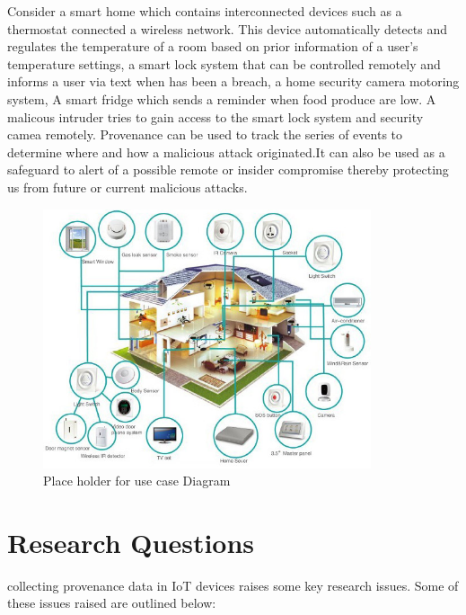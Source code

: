 Consider a smart home which contains interconnected devices such as a thermostat connected a wireless network. This device automatically detects and regulates the temperature of a room based on prior information of a user's temperature settings, a smart lock system that can be controlled remotely and informs a user via text when has been a breach, a home security camera motoring system, A smart fridge which sends a reminder when food produce are low. A malicous intruder tries to gain access to the smart lock system and security camea remotely. Provenance can be used to track the series  of events to determine where and how a malicious attack originated.It can also be used as a safeguard to alert of a possible remote or insider compromise thereby protecting us from future or current malicious attacks.

\begin{figure}[h!]
\begin{center}

\includegraphics[height=3in]{smarthome-diagram.png}
\end{center}
\caption{Place holder for use case Diagram}

\end{figure}






\section{Research Questions}
collecting provenance data in IoT devices raises some key research issues. Some of these issues raised are outlined below:

